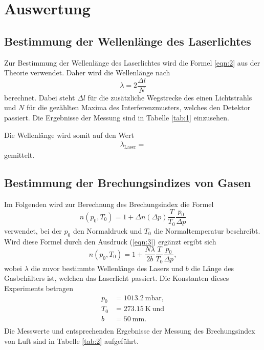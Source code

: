 \section{Auswertung}
\label{sec:Auswertung}

\subsection{Bestimmung der Wellenlänge des Laserlichtes}

Zur Bestimmung der Wellenlänge des Laserlichtes wird die Formel \ref{eqn:2} aus der Theorie verwendet.
Daher wird die Wellenlänge nach
\begin{equation}
  \lambda = 2\frac{\Delta l}{N}
\end{equation}
berechnet.
Dabei steht $\Delta l$ für die zusätzliche Wegstrecke des einen Lichtstrahls und $N$ für die gezählten Maxima des Interferenzmusters, welches den Detektor passiert.
Die Ergebnisse der Messung sind in Tabelle \ref{tab:1} einzusehen.



Die Wellenlänge wird somit auf den Wert
\begin{align*}
  \lambda_{\text{Laser}} = 
\end{align*}
gemittelt.

\subsection{Bestimmung der Brechungsindizes von Gasen}

Im Folgenden wird zur Berechnung des Brechungsindex die Formel
\begin{equation}
  n(p_0,T_0) = 1 +\Delta n(\Delta p) \frac{T}{T_0}\frac{p_0}{\Delta p}
\end{equation}
verwendet, bei der $p_0$ den Normaldruck und $T_0$ die Normaltemperatur beschreibt.
Wird diese Formel durch den Ausdruck (\ref{eqn:3}) ergänzt ergibt sich
\begin{equation}
  n(p_0,T_0) = 1 +\frac{N \lambda}{2b} \frac{T}{T_0}\frac{p_0}{\Delta p},
\end{equation}
wobei $\lambda$ die zuvor bestimmte Wellenlänge des Lasers und $b$ die Länge des Gasbehälters ist, welchen das Laserlicht passiert.
Die Konstanten dieses Experiments betragen
\begin{align*}
  p_0 &= \SI{1013,2}{\milli\bar},\\
  T_0 &= \SI{273,15}{\kelvin} \: \text{und}\\
  b   &= \SI{50}{\milli\metre}.\\
\end{align*}
Die Messwerte und entsprechenden Ergebnisse der Messung des Brechungsindex von Luft sind in Tabelle \ref{tab:2} aufgeführt.

